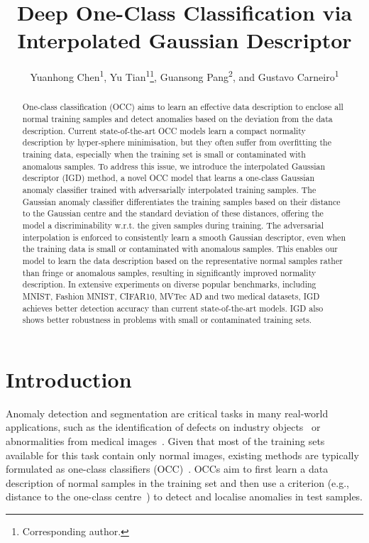 \documentclass[letterpaper]{article} \usepackage{aaai22}  \usepackage{times}  \usepackage{helvet}  \usepackage{courier}  \usepackage[hyphens]{url}  \usepackage{graphicx} \urlstyle{rm} \def\UrlFont{\rm}  \usepackage{natbib}  \usepackage{caption} \DeclareCaptionStyle{ruled}{labelfont=normalfont,labelsep=colon,strut=off} \frenchspacing  \setlength{\pdfpagewidth}{8.5in}  \setlength{\pdfpageheight}{11in}  \usepackage{algorithm}
\title{Deep One-Class Classification via Interpolated Gaussian Descriptor}
\author{
Yuanhong Chen\textsuperscript{\rm 1}\equalcontrib,
Yu Tian\textsuperscript{\rm 1}\equalcontrib\thanks{Corresponding author.},
Guansong Pang\textsuperscript{\rm 2}, and
    Gustavo Carneiro\textsuperscript{\rm 1}
}
\begin{document}
\maketitle


\begin{abstract}
One-class classification (OCC) aims to learn an effective data description to enclose all normal training samples and detect anomalies based on the deviation from the data description. 
Current state-of-the-art OCC models learn a compact normality description by hyper-sphere minimisation, but they often suffer from overfitting the training data, especially when the training set is small or contaminated with anomalous samples. 
To address this issue, we introduce the interpolated Gaussian descriptor (IGD) method, a novel OCC model that learns a one-class Gaussian anomaly classifier trained with adversarially interpolated training samples.  
The Gaussian anomaly classifier differentiates the training samples based on their distance to the Gaussian centre and the standard deviation of these distances, offering the model a discriminability w.r.t. the given samples during training. 
The adversarial interpolation is enforced to consistently learn a smooth Gaussian descriptor, even when the training data is small or contaminated with anomalous samples. 
This enables our model to learn the data description based on the representative normal samples rather than fringe or anomalous samples, resulting in significantly improved normality description. 
In extensive experiments on diverse popular benchmarks, including MNIST, Fashion MNIST, CIFAR10, MVTec AD and two medical datasets, IGD achieves better detection accuracy than current state-of-the-art models. IGD also shows better robustness
in problems with small or contaminated training sets. 






\end{abstract}

\section{Introduction}
Anomaly detection and segmentation are critical tasks in many real-world applications, such as the identification of defects on industry objects~\cite{mvtecad} or abnormalities from medical images~\cite{anogan,f-anogan}.
Given that most of the training sets available for this task contain only normal images, existing methods are typically formulated as one-class classifiers (OCC)~\cite{venkataramanan2019attention,dsvdd}.
OCCs aim to first learn a data description of normal samples in the training set and then use a criterion (e.g., distance to the one-class centre~\cite{dsvdd}) to detect and localise anomalies in test samples. 
\end{document}
